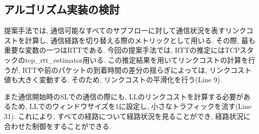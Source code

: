 \subsection{アルゴリズム実装の検討}
提案手法では, 通信可能なすべてのサブフローに対して通信状況を表すリンクコストを計算し, 通信経路を切り替える際のメトリックとして用いる. 
その際, 最も重要な変数の一つはRTTである. 
今回の提案手法では, RTTの推定にはTCPスタックのtcp\_rtt\_estimator用いる.
この推定結果を用いてリンクコストの計算を行うが, RTTや前のパケットの到着時間の差分の揺らぎによっては, リンクコスト値も大きく変動する. 
そのため, リンクコストの平滑化を行う(Line 9). 

また通信開始時のSLでの通信の際にも, LLのリンクコストを計算する必要があるため, LLでのウィンドウサイズを1に設定し,
小さなトラフィックを流す(Line 31).
これにより, すべての経路について経路状況を見ることができ, 経路状況に合わせた制御をすることができる. 





